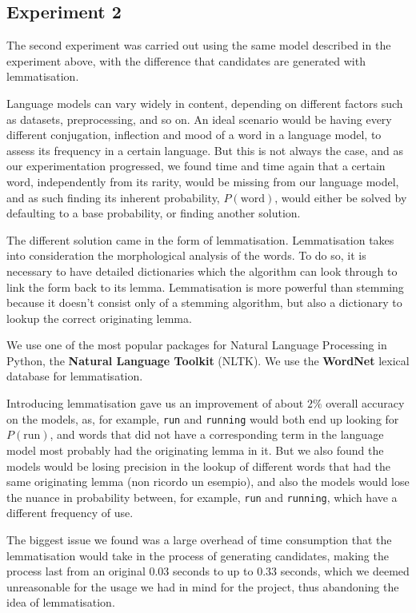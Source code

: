 \subsection{Experiment 2}
The second experiment was carried out using the same model described in the experiment above, with the 
difference that candidates are generated with lemmatisation.  

Language models can vary widely in content, depending on different factors such as datasets, preprocessing, and 
so on. An ideal scenario would be having every different conjugation, inflection and mood of a word in a language 
model, to assess its frequency in a certain language. But this is not always the case, and as our experimentation 
progressed, we found time and time again that a certain word, independently from its rarity, would be missing 
from our language model, and as such finding its inherent probability, $P(\mbox{word})$, would either be solved 
by defaulting to a base probability, or finding another solution.

The different solution came in the form of lemmatisation.
Lemmatisation takes into consideration the morphological analysis of the words. To do so, it is necessary to have 
detailed dictionaries which the algorithm can look through to link the form back to its lemma. Lemmatisation is 
more powerful than stemming because it doesn't consist only of a stemming algorithm, but also a dictionary to 
lookup the correct originating lemma.

We use one of the most popular packages for Natural Language Processing in Python, the \textbf{Natural 
Language Toolkit} (NLTK). We use the \textbf{WordNet} lexical database for lemmatisation.

Introducing lemmatisation gave us an improvement of about $2\%$ overall accuracy on the models, as, for 
example, 
\texttt{run} and \texttt{running} would both end up looking for $P(\mbox{run})$, and words that did not have a 
corresponding term in the language model most probably had the originating lemma in it. But we also found the 
models would be losing precision in the lookup of different words that had the same originating lemma (non 
ricordo un esempio), and also the models would lose the nuance in probability between, for example, \texttt{run} 
and \texttt{running}, which have a different frequency of use.

The biggest issue we found was a large overhead of time consumption that the lemmatisation would take in the 
process of generating candidates, making the process last from an original \num{0,03} seconds to up to 
\num{0,33} seconds, which we deemed unreasonable for the usage we had in mind for the project, thus 
abandoning the idea of lemmatisation.

